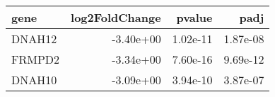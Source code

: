 \begin{tabular}{lrrr}
\toprule
  gene &  log2FoldChange &   pvalue &     padj \\
\midrule
DNAH12 &       -3.40e+00 & 1.02e-11 & 1.87e-08 \\
FRMPD2 &       -3.34e+00 & 7.60e-16 & 9.69e-12 \\
DNAH10 &       -3.09e+00 & 3.94e-10 & 3.87e-07 \\
\bottomrule
\end{tabular}
